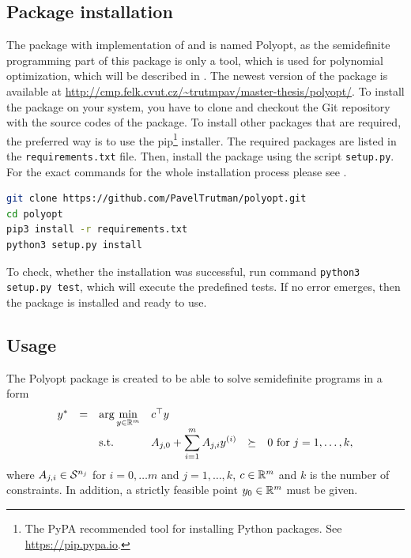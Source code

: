 \subsection{Package installation}
The package with implementation of  and  is named Polyopt, as the semidefinite programming part of this package is only a tool, which is  used for polynomial optimization, which will be described in .
The newest version of the package is available at \url{http://cmp.felk.cvut.cz/~trutmpav/master-thesis/polyopt/}.
To install the package on your system, you have to clone and checkout the Git repository with the source codes of the package.
To install other packages that are required, the preferred way is to use the pip\footnote{The PyPA recommended tool for installing Python packages. See \url{https://pip.pypa.io}.} installer. The required packages are listed in the \texttt{requirements.txt} file.
Then, install the package using the script \texttt{setup.py}.
For the exact commands for the whole installation process please see .
\begin{lstlisting}[language=bash, caption={Installation of the package Polyopt.}, labellis={SDP:imp:install}]
git clone https://github.com/PavelTrutman/polyopt.git
cd polyopt
pip3 install -r requirements.txt
python3 setup.py install
\end{lstlisting}
To check, whether the installation was successful, run command \texttt{python3 setup.py test}, which will execute the predefined tests.
If no error emerges, then the package is installed and ready to use.

\subsection{Usage}
The Polyopt package is created to be able to solve semidefinite programs in a form
\begin{eqnarray}
  \begin{array}{rclrrclcll}
    y^* &=& \displaystyle \arg\min_{y\in\R^m} & \multicolumn{3}{l}{c^\top y} \\
    && \text{s.t.} & \displaystyle A_{j,0} + \sum_{i=1}^m A_{j,i}y\ind i &\succeq& 0 \text{ for } j = 1,\ldots,k,
  \end{array}
\end{eqnarray}
where $A_{j,i}\in\mathcal{S}^{n_j}$ for $i = 0,\dots m$ and $j=1,\dots,k$, $c\in\mathbb{R}^m$ and $k$ is the number of constraints.
In addition, a strictly feasible point $y_0\in\mathbb{R}^m$ must be given.

